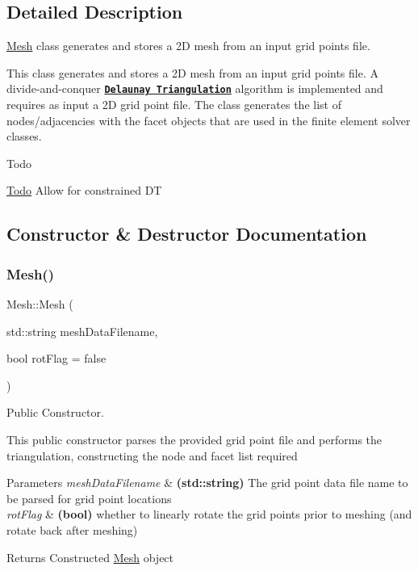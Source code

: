 \subsection{Detailed Description}
\mbox{\hyperlink{class_mesh}{Mesh}} class generates and stores a 2D mesh from an input grid points file. 

This class generates and stores a 2D mesh from an input grid points file. A divide-\/and-\/conquer {\bfseries \href{https://en.wikipedia.org/wiki/Delaunay_triangulation}{\tt Delaunay Triangulation}} algorithm is implemented and requires as input a 2D grid point file. The class generates the list of nodes/adjacencies with the facet objects that are used in the finite element solver classes. \begin{DoxyRefDesc}{Todo}
\item[\mbox{\hyperlink{todo__todo000007}{Todo}}]Allow for constrained DT \end{DoxyRefDesc}


\subsection{Constructor \& Destructor Documentation}
\mbox{\label{class_mesh_ade26657ad48e8e84af8a2614a8ac6b0c}} 
\subsubsection{\texorpdfstring{Mesh()}{Mesh()}}
{\footnotesize\ttfamily Mesh\+::\+Mesh (\begin{DoxyParamCaption}\item[{std\+::string}]{mesh\+Data\+Filename,  }\item[{bool}]{rot\+Flag = {\ttfamily false} }\end{DoxyParamCaption})}



Public Constructor. 

This public constructor parses the provided grid point file and performs the triangulation, constructing the node and facet list required 
\begin{DoxyParams}{Parameters}
{\em mesh\+Data\+Filename} & {\bfseries (std\+::string)} The grid point data file name to be parsed for grid point locations \\
\hline
{\em rot\+Flag} & {\bfseries (bool)} whether to linearly rotate the grid points prior to meshing (and rotate back after meshing) \\
\hline
\end{DoxyParams}
\begin{DoxyReturn}{Returns}
Constructed \mbox{\hyperlink{class_mesh}{Mesh}} object 
\end{DoxyReturn}
\mbox{\label{class_mesh_a5efe4da1a4c0971cfb037bd70304c303}} 

